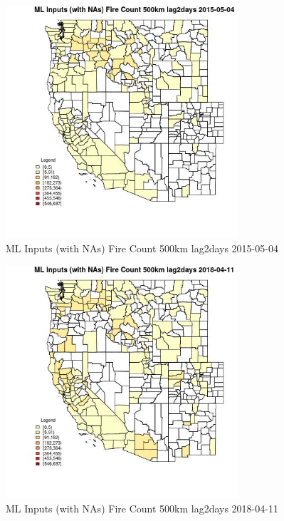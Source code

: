 \begin{figure} 
\centering  
\includegraphics[width=0.77\textwidth]{Code_Outputs/Report_ML_input_PM25_Step4_part_e_de_duplicated_aves_compiled_2019-05-18wNAs_CountyFire_Count_500km_lag2daysMean2015-05-04.jpg} 
\caption{\label{fig:Report_ML_input_PM25_Step4_part_e_de_duplicated_aves_compiled_2019-05-18wNAsCountyFire_Count_500km_lag2daysMean2015-05-04}ML Inputs (with NAs) Fire Count 500km lag2days 2015-05-04} 
\end{figure} 
 

\clearpage 

\begin{figure} 
\centering  
\includegraphics[width=0.77\textwidth]{Code_Outputs/Report_ML_input_PM25_Step4_part_e_de_duplicated_aves_compiled_2019-05-18wNAs_CountyFire_Count_500km_lag2daysMean2018-04-11.jpg} 
\caption{\label{fig:Report_ML_input_PM25_Step4_part_e_de_duplicated_aves_compiled_2019-05-18wNAsCountyFire_Count_500km_lag2daysMean2018-04-11}ML Inputs (with NAs) Fire Count 500km lag2days 2018-04-11} 
\end{figure} 
 

